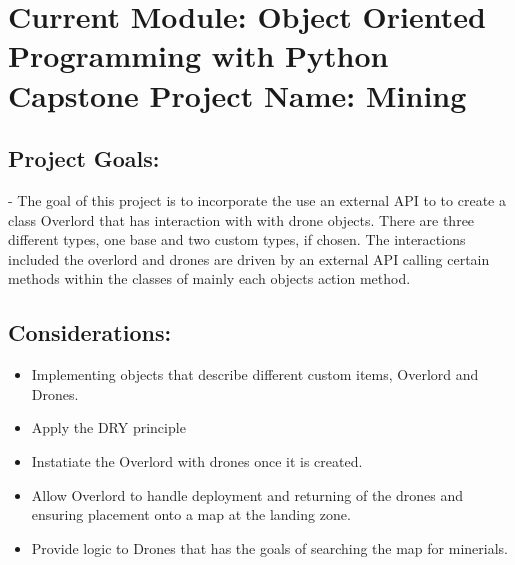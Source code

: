 \documentclass{article}
\begin{document}
\author{Guidry, Joseph}
\date{\ 22 SEPT 2017}

\section{Current Module: Object Oriented Programming with Python Capstone
Project Name:  Mining}

\subsection{Project Goals:}
	- The goal of this project is to incorporate the use an external API to to create a class Overlord that has interaction with with drone objects. There are three different types, one base and two custom types, if chosen.  The interactions included the overlord and drones are driven by an external API calling certain methods within the classes of mainly each objects action method. 
	
\subsection{Considerations:}
\begin{itemize}
    \item Implementing objects that describe different custom items, Overlord and Drones.
    \item Apply the DRY principle
    \item Instatiate the Overlord with drones once it is created.
    \item Allow Overlord to handle deployment and returning of the drones and ensuring placement onto a map at the landing zone.
    \item Provide logic to Drones that has the goals of searching the map for minerials. 
\end{itemize}
\end{document}

